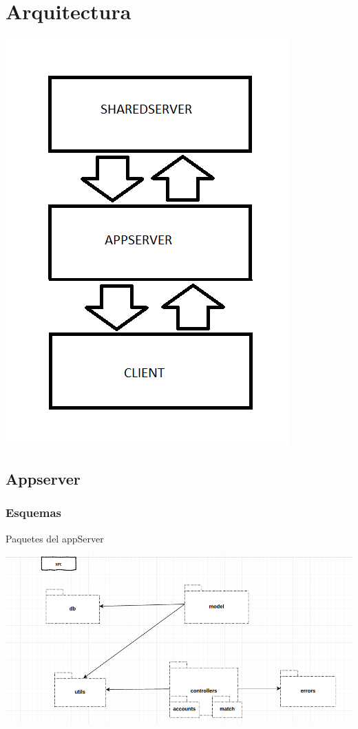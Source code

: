 \documentclass[letterpaper,10pt,english]{sphinxmanual}
\begin{document}
\section{Arquitectura}
\label{manuals:arquitectura}
\includegraphics{architecture.png}


\subsection{Appserver}
\label{manuals:appserver}

\subsubsection{Esquemas}
\label{manuals:esquemas}
Paquetes del appServer

\includegraphics{paquetesApp.png}
\end{document}
